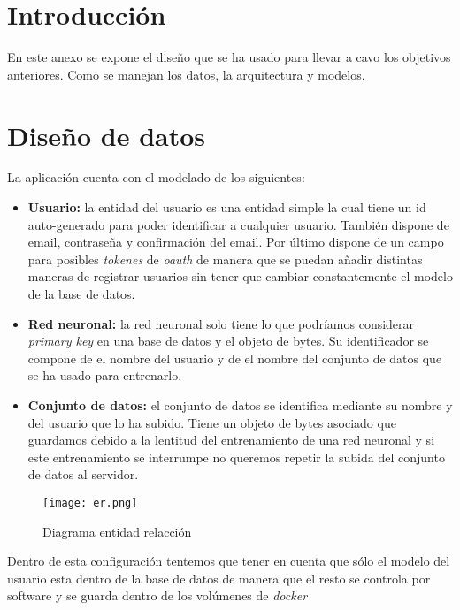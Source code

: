 
\section{Introducción}
En este anexo se expone el diseño que se ha usado para llevar a cavo los objetivos anteriores. Como se manejan los datos, la arquitectura y modelos.

\section{Diseño de datos}
La aplicación cuenta con el modelado de los siguientes:

\begin{itemize}
\item \textbf{Usuario:} la entidad del usuario es una entidad simple la cual tiene un id auto-generado para poder identificar a cualquier usuario. También dispone de email, contraseña y confirmación del email. Por último dispone de un campo para posibles \emph{tokenes} de \emph{oauth} de manera que se puedan añadir distintas maneras de registrar usuarios sin tener que cambiar constantemente el modelo de la base de datos.

\item \textbf{Red neuronal:} la red neuronal solo tiene lo que podríamos considerar \emph{primary key} en una base de datos y el objeto de bytes. Su identificador se compone de el nombre del usuario y de el nombre del conjunto de datos que se ha usado para entrenarlo. 

\item \textbf{Conjunto de datos:} el conjunto de datos se identifica mediante su nombre y del usuario que lo ha subido. Tiene un objeto de bytes asociado que guardamos debido a la lentitud del entrenamiento de una red neuronal y si este entrenamiento se interrumpe no queremos repetir la subida del conjunto de datos al servidor.

\end{itemize}

\begin{figure}
	\centering
	\texttt{[image: er.png]}
	\caption{Diagrama entidad relacción}\label{fig:er.png}
\end{figure}


Dentro de esta configuración tentemos que tener en cuenta que sólo el modelo del usuario esta dentro de la base de datos de manera que el resto se controla por software y se guarda dentro de los volúmenes de \emph{docker}


